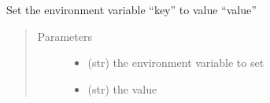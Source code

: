 \documentclass[a4paper,10pt,english]{sphinxmanual}
\begin{document}
\begin{fulllineitems}
\begin{fulllineitems}
\begin{quote}
\begin{description}
\end{description}\end{quote}

\end{fulllineitems}


\begin{fulllineitems}
\label{\detokenize{apidoc_src/src:src.fileEnviron.BashFileEnviron.set}}
Set the environment variable “key” to value “value”
\begin{quote}\begin{description}
\item[{Parameters}] \leavevmode\begin{itemize}
\item {} 
 \textendash{} (str) the environment variable to set

\item {} 
 \textendash{} (str) the value

\end{itemize}

\end{description}\end{quote}

\end{fulllineitems}


\end{fulllineitems}

\end{document}
